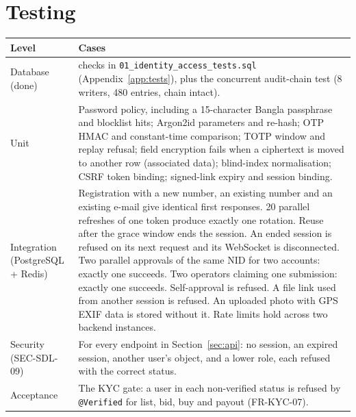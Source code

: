 \documentclass[11pt,a4paper]{article}
\newenvironment{dtable}[1]{\small\begin{longtable}{#1}}{\end{longtable}}
\begin{document}
\section{Testing}
\begin{dtable}{@{}>{\raggedright\arraybackslash}p{3.2cm}>{\raggedright\arraybackslash}p{12cm}@{}}
\toprule
\textbf{Level} & \textbf{Cases} \\ \midrule \endhead
Database (done) & 46 checks in \texttt{01\_identity\_access\_tests.sql} (Appendix~\ref{app:tests}), plus the concurrent audit-chain test (8 writers, 480 entries, chain intact). \\
Unit & Password policy, including a 15-character Bangla passphrase and blocklist hits; Argon2id parameters and re-hash; OTP HMAC and constant-time comparison; TOTP window and replay refusal; field encryption fails when a ciphertext is moved to another row (associated data); blind-index normalisation; CSRF token binding; signed-link expiry and session binding. \\
Integration (PostgreSQL + Redis) & Registration with a new number, an existing number and an existing e-mail give identical first responses. 20 parallel refreshes of one token produce exactly one rotation. Reuse after the grace window ends the session. An ended session is refused on its next request and its WebSocket is disconnected. Two parallel approvals of the same NID for two accounts: exactly one succeeds. Two operators claiming one submission: exactly one succeeds. Self-approval is refused. A file link used from another session is refused. An uploaded photo with GPS EXIF data is stored without it. Rate limits hold across two backend instances. \\
Security (SEC-SDL-09) & For every endpoint in Section~\ref{sec:api}: no session, an expired session, another user's object, and a lower role, each refused with the correct status. \\
Acceptance & The KYC gate: a user in each non-verified status is refused by \texttt{@Verified} for list, bid, buy and payout (FR-KYC-07). \\
\bottomrule
\end{dtable}

\end{document}
